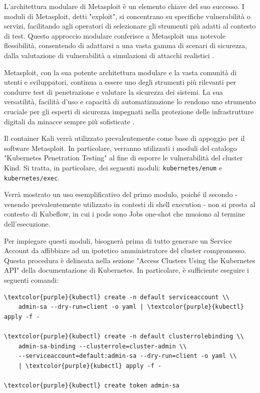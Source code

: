 L'architettura modulare di Metasploit è un elemento chiave del suo successo. I moduli di Metasploit, detti "exploit", si concentrano su specifiche vulnerabilità o servizi, facilitando agli operatori di selezionare gli strumenti più adatti al contesto di test. Questo approccio modulare conferisce a Metasploit una notevole flessibilità, consentendo di adattarsi a una vasta gamma di scenari di sicurezza, dalla valutazione di vulnerabilità a simulazioni di attacchi realistici \cite{metasploit_modularity}.

Metasploit, con la sua potente architettura modulare e la vasta comunità di utenti e sviluppatori, continua a essere uno degli strumenti più rilevanti per condurre test di penetrazione e valutare la sicurezza dei sistemi. La sua versatilità, facilità d'uso e capacità di automatizzazione lo rendono uno strumento cruciale per gli esperti di sicurezza impegnati nella protezione delle infrastrutture digitali da minacce sempre più sofisticate \cite{metasploit_future}.

Il container Kali verrà utilizzato prevalentemente come base di appoggio per il software Metasploit. In particolare, verranno utilizzati i moduli del catalogo "Kubernetes Penetration Testing" al fine di esporre le vulnerabilità del cluster Kind. Si tratta, in particolare, dei seguenti moduli: {\small \verb|kubernetes/enum|} e {\small \verb|kubernetes/exec|}.

Verrà mostrato un uso esemplificativo del primo modulo, poiché il secondo - venendo prevalentemente utilizzato in contesti di shell execution - non si presta al contesto di Kubeflow, in cui i pods sono Jobs one-shot che muoiono al termine dell'esecuzione.

Per impiegare questi moduli, bisognerà prima di tutto generare un Service Account da affibbiare ad un ipotetico amministratore del cluster compromesso. Questa procedura è delineata nella sezione "Access Clusters Using the Kubernetes API" \cite{k8s-docs-access} della documentazione di Kubernetes. In particolare, è sufficiente eseguire i seguenti comandi:

\begin{small}
\begin{Verbatim}[commandchars=\\\{\}]
\textcolor{purple}{kubectl} create -n default serviceaccount \\
    admin-sa --dry-run=client -o yaml | \textcolor{purple}{kubectl} apply -f -

\textcolor{purple}{kubectl} create -n default clusterrolebinding \\
    admin-sa-binding --clusterrole=cluster-admin \\
    --serviceaccount=default:admin-sa --dry-run=client -o yaml \\
    | \textcolor{purple}{kubectl} apply -f -

\textcolor{purple}{kubectl} create token admin-sa
\end{Verbatim}
\end{small}

